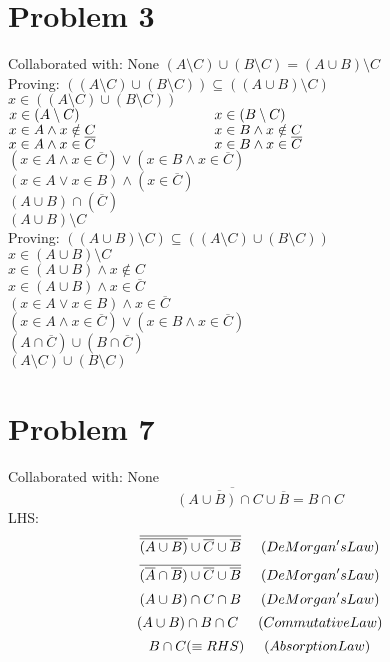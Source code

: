 \documentclass{article}
\begin{document}
\section{Problem 3}
Collaborated with: None
$(A\setminus C) \cup (B\setminus C) = (A\cup B) \setminus C$\\ 
Proving: $((A\setminus C) \cup (B\setminus C)) \subseteq ((A\cup B) \setminus C)$\\ 
$x \in ((A\setminus C) \cup (B\setminus C))$\\
$x \in (A \setminus C) \hspace{34mm} x\in(B \setminus C)$\\
$x \in A \wedge x \notin C \hspace{30mm} x \in B \wedge x \notin C $\\
$x \in A \wedge x \in \overline{C} \hspace{30mm} x \in B \wedge x \in \overline{C} $\\
$(x \in A \wedge x \in \overline{C}) \vee (x \in B \wedge x \in \overline{C}) $\\
$(x \in A \vee x \in B) \wedge (x \in \overline{C}) $\\
$(A \cup B) \cap (\overline{C}) $\\
$(A\cup B) \setminus C$\\
Proving: 
$((A\cup B) \setminus C) \subseteq ((A\setminus C) \cup (B\setminus C))$\\
$x \in (A \cup B) \setminus C$\\
$x \in (A \cup B) \wedge x\notin C$\\
$x \in (A \cup B) \wedge x\in \overline{C}$\\
$(x \in A \vee x \in B) \wedge x\in \overline{C}$\\
$(x \in A \wedge x \in \overline{C}) \vee (x \in B \wedge x \in \overline{C})$\\
$(A \cap \overline{C}) \cup (B \cap \overline{C})$\\
$(A \setminus C) \cup (B \setminus C)$\\

\section{Problem 7}
Collaborated with: None
$$\overline{\overline{(A \cup B) \cap C} \cup \overline{B}} = B \cap C$$
\hspace{53mm}LHS: 
$$\overline{\overline{(A \cup B)}\cup \overline{C} \cup \overline{B}} \hspace{5mm} (De Morgan's Law)$$ 
$$\overline{(\overline{A} \cap \overline{B}) \cup \overline{C} \cup \overline{B}} \hspace{5mm} (De Morgan's Law) $$
$$(A \cup B) \cap C \cap B \hspace{5mm} (De Morgan's Law) $$
$$(A \cup B) \cap B \cap C \hspace{5mm} (Commutative Law) $$
$$B \cap C (\equiv RHS)\hspace{5mm} (Absorption Law) $$
\end{document}
